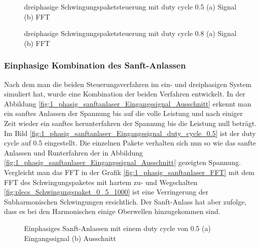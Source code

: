 \begin{figure}[ht!]
	\centering
	\qquad
	\caption{dreiphasige Schwingungspaketsteuerung mit duty cycle 0.5 (a) Signal (b) FFT}
	\label{fig:3_phasiges_Schwingungspaket_0_5}
\end{figure}



\begin{figure}[ht!]
	\centering
	\qquad
	\caption{dreiphasige Schwingungspaketsteuerung mit duty cycle 0.8 (a) Signal (b) FFT}
	\label{fig:3_phasiges_Schwingungspaket_0_8}
\end{figure}

\newpage
\subsubsection{Einphasige Kombination des Sanft-Anlassen}

Nach dem man die beiden Steuerungsverfahren im ein- und dreiphasigen System simuliert hat, wurde eine Kombination der beiden Verfahren entwickelt. In der Abbildung \ref{fig:1_phasig_sanftanlaser_Eingangssignal_Ausschnitt} erkennt man ein sanftes Anlassen der Spannung bis auf die volle Leistung und nach einiger Zeit wieder ein sanftes herunterfahren der Spannung bis die Leistung null beträgt. Im Bild \ref{fig:1_phasig_sanftanlaser_Eingangssignal_duty_cycle_0.5} ist der duty cycle auf 0.5 eingestellt. Die einzelnen Pakete verhalten sich nun so wie das sanfte Anlassen und Runterfahren der in Abbildung \ref{fig:1_phasig_sanftanlaser_Eingangssignal_Ausschnitt} gezeigten Spannung. Vergleicht man das FFT in der Grafik \ref{fig:1_phasig_sanftanlaser_FFT} mit dem FFT des Schwingungspaketes mit hartem zu- und Wegschalten \ref{fig:plecs_Schwingungspaket_0_5_1000} ist eine Verringerung der Subharmonischen Schwingungen ersichtlich. Der Sanft-Anlass hat aber zufolge, dass  es bei den Harmonischen einige Oberwellen hinzugekommen sind. 

\begin{figure}[ht!]
	\centering
	\qquad
	\caption{Einphasiges Sanft-Anlassen mit einem duty cycle von 0.5 (a) Eingangssignal (b) Ausschnitt}
	\label{fig:einphasiges_Sanft_anlassen_Einganssignal}
\end{figure}

